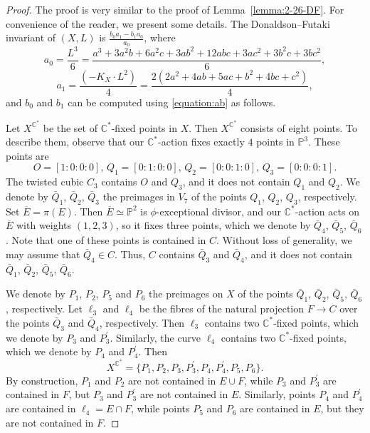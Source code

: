 \documentclass[10pt,a4paper]{amsart}
\newcommand{\C}{\mathbb{C}}
\begin{document}
\begin{proof}
The proof is very similar to  the proof of Lemma~\ref{lemma:2-26-DF}. For convenience of the reader, we present some details.
The Donaldson--Futaki invariant of $(X,L)$ is $\frac{b_0a_1-b_1a_0}{a_0}$, where
$$
a_0=\frac{L^3}{6}=\frac{a^3+3a^2b+6a^2c+3ab^2+12abc+3ac^2+3b^2c+3bc^2}{6},
$$
$$
a_1=\frac{(-K_X\cdot L^2)}{4}=\frac{2(2a^2+4ab+5ac+b^2+4bc+c^2)}{4},
$$
and $b_0$ and $b_1$ can be computed using  \eqref{equation:ab} as follows.

Let $X^{\C^*}$ be the set of $\mathbb{C}^*$-fixed points in $X$.
Then $X^{\C^*}$ consists of eight points.
To describe them, observe that our $\mathbb{C}^*$-action fixes exactly $4$ points in $\mathbb{P}^3$. These points are
$$
O=[1:0:0:0],\,
Q_1=[0:1:0:0],\,
Q_2=[0:0:1:0],\,
Q_3=[0:0:0:1].
$$
The twisted cubic $C_3$ contains $O$ and $Q_3$, and it does not contain $Q_1$ and $Q_2$.
We denote by $\bar{Q}_1$, $\bar{Q}_2$, $\bar{Q}_3$ the preimages in $V_7$ of the points $Q_1$, $Q_2$, $Q_3$, respectively.
Set $\overline{E}=\pi(E)$. Then $\overline{E}\simeq\mathbb{P}^2$ is $\phi$-exceptional divisor,
and our $\C^*$-action acts on $\overline{E}$ with weights $(1,2,3)$, so it fixes three points,
which we denote by $\bar{Q}_4$, $\bar{Q}_5$, $\bar{Q}_6$.
Note that one of these points is contained in $C$. Without loss of generality, we may assume that $\bar{Q}_4\in C$.
Thus, $C$ contains $\bar{Q}_3$ and $\bar{Q}_4$, and it does not contain  $\bar{Q}_1$, $\bar{Q}_2$, $\bar{Q}_5$, $\bar{Q}_6$.

We denote by $P_1$, $P_2$, $P_5$ and $P_6$ the preimages on $X$ of the points $\bar{Q}_1$, $\bar{Q}_2$, $\bar{Q}_5$, $\bar{Q}_6$, respectively.
Let $\ell_3$ and $\ell_4$ be the fibres of the natural projection $F\to C$ over the points $\bar{Q}_3$ and $\bar{Q}_4$, respectively.
Then $\ell_3$ contains two $\mathbb{C}^*$-fixed points, which we denote by $P_3$ and $P_3^\prime$.
Similarly, the curve $\ell_4$ contains two $\mathbb{C}^*$-fixed points, which we denote by $P_4$ and $P_4^\prime$.
Then
$$
X^{\C^*}=\big\{P_1,P_2,P_3,P_3^\prime,P_4,P_4^\prime,P_5,P_6\big\}.
$$
By construction, $P_1$ and $P_2$ are not contained in $E\cup F$, while  $P_3$ and $P_3^\prime$ are contained in $F$,
but $P_3$ and $P_3^\prime$ are not contained in $E$.
Similarly, points $P_4$ and $P_4^\prime$ are contained in $\ell_4=E\cap F$, while points $P_5$ and $P_6$ are contained in $E$,
but they are not contained in $F$.


\end{proof}
\end{document}
